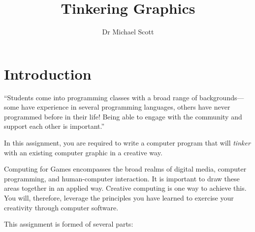 \documentclass{../fal_assignment}
\title{Tinkering Graphics}
\author{Dr Michael Scott}
\begin{document}
\maketitle

\section*{Introduction}

\begin{marginquote}
``Students come into programming classes with a broad range of backgrounds---some have experience in several programming languages, others have never programmed before in their life! Being able to engage with the community and support each other is important.''
\end{marginquote}

In this assignment, you are required to write a computer program that will \textit{tinker} with an existing computer graphic in a creative way.

Computing for Games encompasses the broad realms of digital media, computer programming, and human-computer interaction. It is important to draw these areas together in an applied way. Creative computing is one way to achieve this. You will, therefore, leverage the principles you have learned to exercise your creativity through computer software. 

This assignment is formed of several parts:
\end{document}

